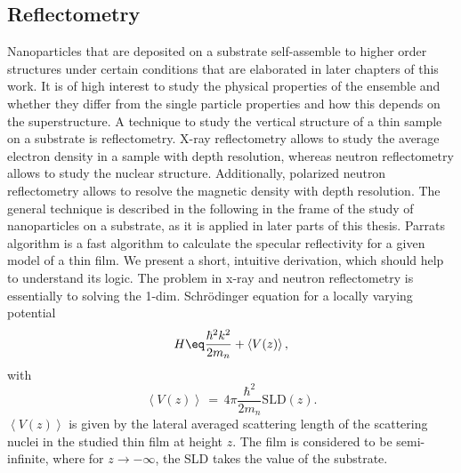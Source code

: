 \documentclass[\main/dresen_thesis.tex]{subfiles}
\begin{document}
  \subsection{Reflectometry}\label{sec:theoreticalBackground:scattering:reflectometry}
    Nanoparticles that are deposited on a substrate self-assemble to higher order structures under certain conditions that are elaborated in later chapters of this work.
    It is of high interest to study the physical properties of the ensemble and whether they differ from the single particle properties and how this depends on the superstructure.
    A technique to study the vertical structure of a thin sample on a substrate is reflectometry.
    X-ray reflectometry allows to study the average electron density in a sample with depth resolution, whereas neutron reflectometry allows to study the nuclear structure.
    Additionally, polarized neutron reflectometry allows to resolve the magnetic density with depth resolution.
    The general technique is described in the following in the frame of the study of nanoparticles on a substrate, as it is applied in later parts of this thesis.
    \label{ch:appendix:numericalMethods:parrat}
    Parrats algorithm is a fast algorithm to calculate the specular reflectivity for a given model of a thin film.
    We present a short, intuitive derivation, which should help to understand its logic. The problem in x-ray and neutron reflectometry is essentially to solving the 1-dim.
    Schr\"odinger equation for a locally varying potential
    \begin{equation}
    H \eq \frac{\hbar^2 k^2}{2m_n} + \left<V(z)\right>,
    \end{equation}
    with
    \begin{equation}
    \left<V(z)\right> \, = \, 4\pi \frac{\hbar^2}{2 m_n} \mathrm{SLD}(z).
    \end{equation}
    $\left<V(z)\right> $ is given by the lateral averaged scattering length of the scattering nuclei in the studied thin film at height $z$. The film is considered to be semi-infinite, where for $z \rightarrow -\infty$, the SLD takes the value of the substrate. 
\end{document}

